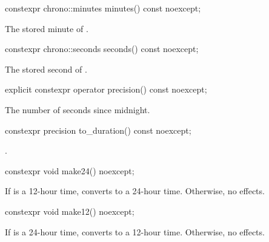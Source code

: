 %
\begin{itemdecl}
constexpr chrono::minutes minutes() const noexcept;
\end{itemdecl}

\begin{itemdescr}
\pnum
\returns
The stored minute of .
\end{itemdescr}

%
\begin{itemdecl}
constexpr chrono::seconds seconds() const noexcept;
\end{itemdecl}

\begin{itemdescr}
\pnum
\returns
The stored second of .
\end{itemdescr}

%
\begin{itemdecl}
explicit constexpr operator precision() const noexcept;
\end{itemdecl}

\begin{itemdescr}
\pnum
\returns
The number of seconds since midnight.
\end{itemdescr}

%
\begin{itemdecl}
constexpr precision to_duration() const noexcept;
\end{itemdecl}

\begin{itemdescr}
\pnum
\returns {}.
\end{itemdescr}

%
\begin{itemdecl}
constexpr void make24() noexcept;
\end{itemdecl}

\begin{itemdescr}
\pnum
\effects
If  is a 12-hour time,
converts to a 24-hour time.
Otherwise, no effects.
\end{itemdescr}

%
\begin{itemdecl}
constexpr void make12() noexcept;
\end{itemdecl}

\begin{itemdescr}
\pnum
\effects
If  is a 24-hour time,
converts to a 12-hour time.
Otherwise, no effects.
\end{itemdescr}

